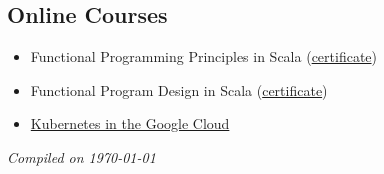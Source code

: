 \documentclass[margin,line]{resume}
\begin{document}
\begin{resume}
\section{\mysidestyle Online Courses}
\vspace{0mm}
    \begin{itemize}
        \item Functional Programming Principles in Scala (\href{https://www.coursera.org/account/accomplishments/verify/AU47C6WSX6NR}{certificate})
        \item Functional Program Design in Scala (\href{https://www.coursera.org/account/accomplishments/certificate/VUBNK7HMZENA}{certificate})
        \item \href{https://google.qwiklabs.com/quests/29}{Kubernetes in the Google Cloud}
    \end{itemize}

\hfill \textsl{Compiled on \monthyeardate\today}
%
\end{resume}
\end{document}
